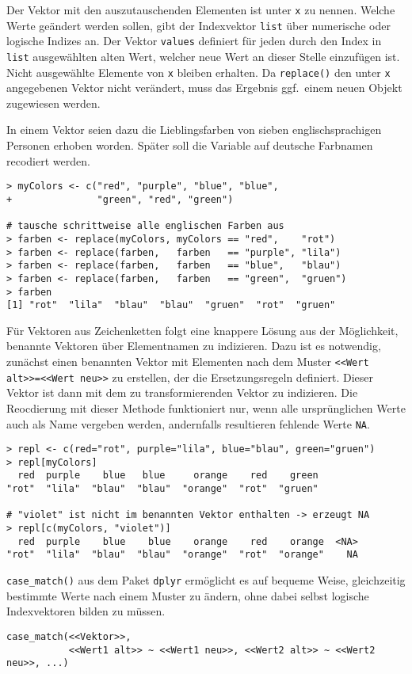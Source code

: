 Der Vektor mit den auszutauschenden Elementen ist unter \lstinline!x! zu nennen. Welche Werte geändert werden sollen, gibt der Indexvektor \lstinline!list! über numerische oder logische Indizes an. Der Vektor \lstinline!values! definiert für jeden durch den Index in \lstinline!list! ausgewählten alten Wert, welcher neue Wert an dieser Stelle einzufügen ist. Nicht ausgewählte Elemente von \lstinline!x! bleiben erhalten. Da \lstinline!replace()! den unter \lstinline!x! angegebenen Vektor nicht verändert, muss das Ergebnis ggf.\ einem neuen Objekt zugewiesen werden.

In einem Vektor seien dazu die Lieblingsfarben von sieben englischsprachigen Personen erhoben worden. Später soll die Variable auf deutsche Farbnamen recodiert werden.
\begin{lstlisting}
> myColors <- c("red", "purple", "blue", "blue",
+               "green", "red", "green")

# tausche schrittweise alle englischen Farben aus
> farben <- replace(myColors, myColors == "red",    "rot")
> farben <- replace(farben,   farben   == "purple", "lila")
> farben <- replace(farben,   farben   == "blue",   "blau")
> farben <- replace(farben,   farben   == "green",  "gruen")
> farben
[1] "rot"  "lila"  "blau"  "blau"  "gruen"  "rot"  "gruen"
\end{lstlisting}

Für Vektoren aus Zeichenketten folgt eine knappere Lösung aus der Möglichkeit, benannte Vektoren über Elementnamen zu indizieren. Dazu ist es notwendig, zunächst einen benannten Vektor mit Elementen nach dem Muster \lstinline!<<Wert alt>>=<<Wert neu>>! zu erstellen, der die Ersetzungsregeln definiert. Dieser Vektor ist dann mit dem zu transformierenden Vektor zu indizieren. Die Reocdierung mit dieser Methode funktioniert nur, wenn alle ursprünglichen Werte auch als Name vergeben werden, andernfalls resultieren fehlende Werte \lstinline!NA!.
\begin{lstlisting}
> repl <- c(red="rot", purple="lila", blue="blau", green="gruen")
> repl[myColors]
  red  purple    blue   blue     orange    red    green
"rot"  "lila"  "blau"  "blau"  "orange"  "rot"  "gruen"

# "violet" ist nicht im benannten Vektor enthalten -> erzeugt NA
> repl[c(myColors, "violet")]
  red  purple    blue    blue    orange    red    orange  <NA>
"rot"  "lila"  "blau"  "blau"  "orange"  "rot"  "orange"    NA
\end{lstlisting}

\lstinline!case_match()! aus dem Paket \lstinline!dplyr! \cite{Wickham2014c} ermöglicht es auf bequeme Weise, gleichzeitig bestimmte Werte nach einem Muster zu ändern, ohne dabei selbst logische Indexvektoren bilden zu müssen.
\begin{lstlisting}
case_match(<<Vektor>>,
           <<Wert1 alt>> ~ <<Wert1 neu>>, <<Wert2 alt>> ~ <<Wert2 neu>>, ...)
\end{lstlisting}

